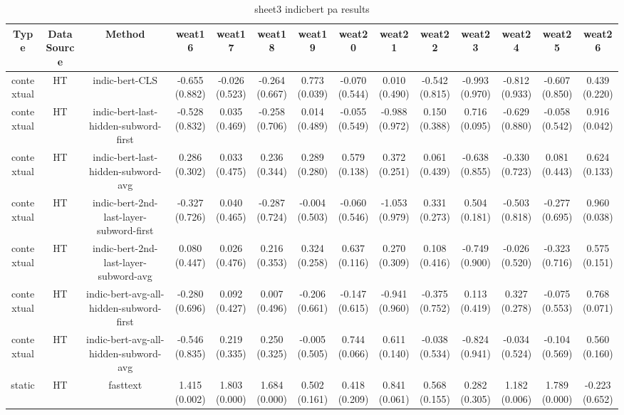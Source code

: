 \begin{sidewaystable}[htb]
    \centering
    \caption{sheet3 indicbert pa results}
    \label{appendix_tab:sheet3_indicbert_pa_results}
    \small
    \begin{tabular}{@{}cccccccccccccc@{}}
        \toprule
        Type & DataSource & Method & weat16 & weat17 & weat18 & weat19 & weat20 & weat21 & weat22 & weat23 & weat24 & weat25 & weat26 \\
        \midrule
        contextual & HT & indic-bert-CLS & -0.655 (0.882) & -0.026 (0.523) & -0.264 (0.667) & 0.773 (0.039) & -0.070 (0.544) & 0.010 (0.490) & -0.542 (0.815) & -0.993 (0.970) & -0.812 (0.933) & -0.607 (0.850) & 0.439 (0.220) \\
        contextual & HT & indic-bert-last-hidden-subword-first & -0.528 (0.832) & 0.035 (0.469) & -0.258 (0.706) & 0.014 (0.489) & -0.055 (0.549) & -0.988 (0.972) & 0.150 (0.388) & 0.716 (0.095) & -0.629 (0.880) & -0.058 (0.542) & 0.916 (0.042) \\
        contextual & HT & indic-bert-last-hidden-subword-avg & 0.286 (0.302) & 0.033 (0.475) & 0.236 (0.344) & 0.289 (0.280) & 0.579 (0.138) & 0.372 (0.251) & 0.061 (0.439) & -0.638 (0.855) & -0.330 (0.723) & 0.081 (0.443) & 0.624 (0.133) \\
        contextual & HT & indic-bert-2nd-last-layer-subword-first & -0.327 (0.726) & 0.040 (0.465) & -0.287 (0.724) & -0.004 (0.503) & -0.060 (0.546) & -1.053 (0.979) & 0.331 (0.273) & 0.504 (0.181) & -0.503 (0.818) & -0.277 (0.695) & 0.960 (0.038) \\
        contextual & HT & indic-bert-2nd-last-layer-subword-avg & 0.080 (0.447) & 0.026 (0.476) & 0.216 (0.353) & 0.324 (0.258) & 0.637 (0.116) & 0.270 (0.309) & 0.108 (0.416) & -0.749 (0.900) & -0.026 (0.520) & -0.323 (0.716) & 0.575 (0.151) \\
        contextual & HT & indic-bert-avg-all-hidden-subword-first & -0.280 (0.696) & 0.092 (0.427) & 0.007 (0.496) & -0.206 (0.661) & -0.147 (0.615) & -0.941 (0.960) & -0.375 (0.752) & 0.113 (0.419) & 0.327 (0.278) & -0.075 (0.553) & 0.768 (0.071) \\
        contextual & HT & indic-bert-avg-all-hidden-subword-avg & -0.546 (0.835) & 0.219 (0.335) & 0.250 (0.325) & -0.005 (0.505) & 0.744 (0.066) & 0.611 (0.140) & -0.038 (0.534) & -0.824 (0.941) & -0.034 (0.524) & -0.104 (0.569) & 0.560 (0.160) \\
        static & HT & fasttext & 1.415 (0.002) & 1.803 (0.000) & 1.684 (0.000) & 0.502 (0.161) & 0.418 (0.209) & 0.841 (0.061) & 0.568 (0.155) & 0.282 (0.305) & 1.182 (0.006) & 1.789 (0.000) & -0.223 (0.652) \\

\end{tabular}
\end{sidewaystable}
